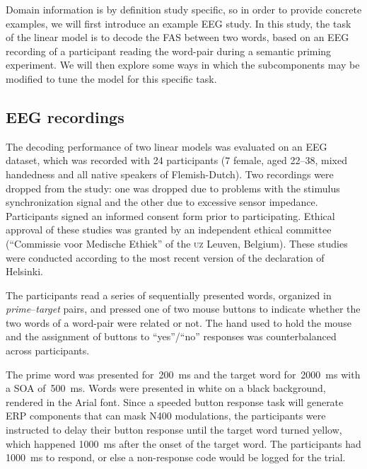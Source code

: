 \documentclass[a4paper]{vanvliet_paper}
\begin{document}

Domain information is by definition study specific, so in order to provide concrete examples, we will first introduce an example \gls{EEG} study.
In this study, the task of the linear model is to decode the \gls{FAS} between two words\cite{Nelson2000}, based on an \gls{EEG} recording of a participant reading the word-pair during a semantic priming experiment.
We will then explore some ways in which the subcomponents may be modified to tune the model for this specific task.

\subsection{EEG recordings}

The decoding performance of two linear models was evaluated on an \gls{EEG} dataset, which was recorded with 24 participants (7 female, aged 22--38, mixed handedness and all native speakers of Flemish-Dutch). Two recordings were dropped from the study: one was dropped due to problems with the stimulus synchronization signal and the other due to excessive sensor impedance.
Participants signed an informed consent form prior to participating.
Ethical approval of these studies was granted by an independent ethical committee (``Commissie voor Medische Ethiek'' of the \textsc{uz} Leuven, Belgium).
These studies were conducted according to the most recent version of the declaration of Helsinki.

The participants read a series of sequentially presented words, organized in \emph{prime}--\emph{target} pairs, and pressed one of two mouse buttons to indicate whether the two words of a word-pair were related or not.
The hand used to hold the mouse and the assignment of buttons to ``yes''/``no'' responses was counterbalanced across participants.

The prime word was presented for~\SI{200}{\milli\second} and the target word for~\SI{2000}{\milli\second} with a \gls{SOA} of~\SI{500}{\milli\second}.
Words were presented in white on a black background, rendered in the Arial font.
Since a speeded button response task will generate \gls{ERP} components that can mask N400 modulations\cite{VanVliet2014}, the participants were instructed to delay their button response until the target word turned yellow, which happened \SI{1000}{\milli\second} after the onset of the target word.
The participants had \SI{1000}{\milli\second} to respond, or else a non-response code would be logged for the trial.
\end{document}
